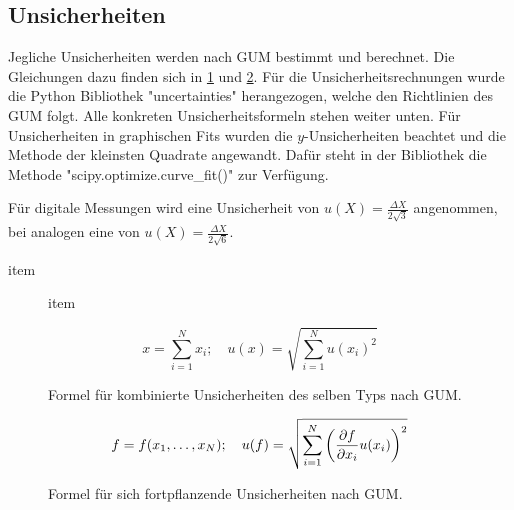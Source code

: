\subsection{Unsicherheiten}\label{VGuD}

Jegliche Unsicherheiten werden nach GUM bestimmt und berechnet.
Die Gleichungen dazu finden sich in \ref{fig:GUM_combine} und \ref{fig:GUM_formula}.
Für die Unsicherheitsrechnungen wurde die Python Bibliothek "uncertainties" herangezogen, welche den Richtlinien des GUM folgt.
Alle konkreten Unsicherheitsformeln stehen weiter unten.
Für Unsicherheiten in graphischen Fits wurden die $y$-Unsicherheiten beachtet und die Methode der kleinsten Quadrate angewandt.
Dafür steht in der Bibliothek die Methode "scipy.optimize.curve\_fit()" zur Verfügung.

Für digitale Messungen wird eine Unsicherheit von $u(X) = \frac{\Delta X}{2\sqrt{3}}$ angenommen, bei analogen eine von $u(X) = \frac{\Delta X}{2\sqrt{6}}$.

\begin{description}
	\item[item] item
	
\end{description}
\begin{figure}[ht]
	\begin{equation*}	
		x = \sum_{i=1}^{N} x_i
		;\quad
		u(x) = \sqrt{\sum_{i = 1}^{N} u(x_i)^2}
	\end{equation*}
	\caption{Formel für kombinierte Unsicherheiten des selben Typs nach GUM.}
	\label{fig:GUM_combine}
\end{figure}

\begin{figure}[ht]
	\begin{align*}
		f = f(x_1, \dots , x_N)
		;\quad
		u(f) = \sqrt{\sum_{i = 1}^{N}\left(\pdv{f}{x_i} u(x_i)\right) ^2}
	\end{align*}
	\caption{Formel für sich fortpflanzende Unsicherheiten nach GUM.}
	\label{fig:GUM_formula}
\end{figure}
